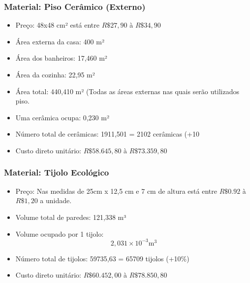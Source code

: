 \subsubsection*{\textbf{Material: Piso Cerâmico (Externo)}}



\begin{itemize}

		\item Preço: 48x48 cm² está entre $R\$ 27,90$ à $R\$ 34,90$

		\item Área externa da casa: 400 m²

		\item Área dos banheiros: 17,460 m²

		\item Área da cozinha: 22,95 m²

		\item Área total: 440,410 m² (Todas as áreas externas nas quais serão utilizados piso.

		\item Uma cerâmica ocupa: 0,230 m²

		\item Número total de cerâmicas: 1911,501 = 2102 cerâmicas (+10%

		\item Custo direto unitário: $R\$ 58.645,80$ à $R\$ 73.359,80$

\end{itemize}

\subsubsection*{\textbf{Material: Tijolo Ecológico}}



\begin{itemize}

		\item Preço: Nas medidas de 25cm x 12,5 cm e 7 cm de altura está entre $R\$ 0.92$ à $R\$ 1,20$ a unidade.

		\item Volume total de paredes: 121,338 m³

		\item Volume ocupado por 1 tijolo: $$2,031\times10^{-3} \si{\meter}^{3}$$

		\item Número total de tijolos: 59735,63 = 65709 tijolos (+10\%)

		\item Custo direto unitário: $R\$60.452,00$ à $R\$78.850,80$


\end{itemize}


